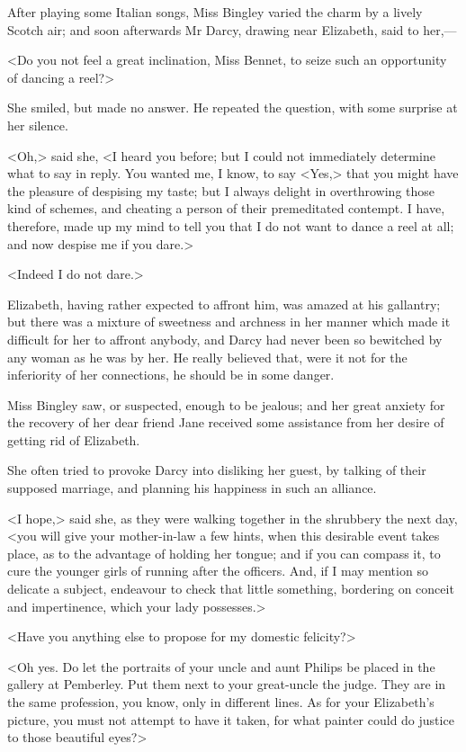 After playing some Italian songs, Miss Bingley varied the charm by a lively Scotch air; and soon afterwards Mr Darcy, drawing near Elizabeth, said to her,—

<Do you not feel a great inclination, Miss Bennet, to seize such an opportunity of dancing a reel?>

She smiled, but made no answer. He repeated the question, with some surprise at her silence.

<Oh,> said she, <I heard you before; but I could not immediately determine what to say in reply. You wanted me, I know, to say <Yes,> that you might have the pleasure of despising my taste; but I always delight in overthrowing those kind of schemes, and cheating a person of their premeditated contempt. I have, therefore, made up my mind to tell you that I do not want to dance a reel at all; and now despise me if you dare.>

<Indeed I do not dare.>

Elizabeth, having rather expected to affront him, was amazed at his gallantry; but there was a mixture of sweetness and archness in her manner which made it difficult for her to affront anybody, and Darcy had never been so bewitched by any woman as he was by her. He really believed that, were it not for the inferiority of her connections, he should be in some danger.

Miss Bingley saw, or suspected, enough to be jealous; and her great anxiety for the recovery of her dear friend Jane received some assistance from her desire of getting rid of Elizabeth.

She often tried to provoke Darcy into disliking her guest, by talking of their supposed marriage, and planning his happiness in such an alliance.

<I hope,> said she, as they were walking together in the shrubbery the next day, <you will give your mother-in-law a few hints, when this desirable event takes place, as to the advantage of holding her tongue; and if you can compass it, to cure the younger girls of running after the officers. And, if I may mention so delicate a subject, endeavour to check that little something, bordering on conceit and impertinence, which your lady possesses.>

<Have you anything else to propose for my domestic felicity?>

<Oh yes. Do let the portraits of your uncle and aunt Philips be placed in the gallery at Pemberley. Put them next to your great-uncle the judge. They are in the same profession, you know, only in different lines. As for your Elizabeth's picture, you must not attempt to have it taken, for what painter could do justice to those beautiful eyes?>

